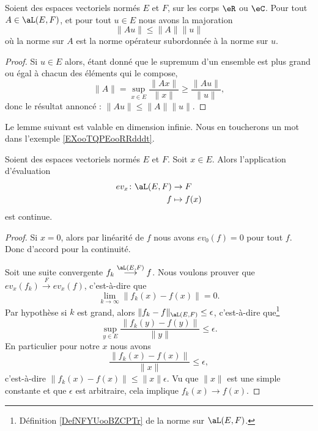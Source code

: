 \begin{lemma}       \label{LEMooIBLEooLJczmu}
	Soient des espaces vectoriels normés \( E\) et \( F\), sur les corps \( \eR\) ou \( \eC\). Pour tout \( A\in \aL(E,F)\), et pour tout \( u\in E\) nous avons la majoration
	\begin{equation}
		\| Au \|\leq \| A \|\| u \|
	\end{equation}
	où la norme sur \( A\) est la norme opérateur subordonnée à la norme sur \( u\).
\end{lemma}

\begin{proof}
	Si \( u\in E\) alors, étant donné que le supremum d'un ensemble est plus grand ou égal à chacun des éléments qui le compose,
	\begin{equation}
		\| A \|=\sup_{x\in E}\frac{ \| Ax \| }{ \| x \| }\geq \frac{ \| Au \| }{ \| u \| },
	\end{equation}
	donc le résultat annoncé : \( \| Au \|\leq \| A \|\| u \|\).
\end{proof}

Le lemme suivant est valable en dimension infinie. Nous en toucherons un mot dans l'exemple \ref{EXooTQPEooRRdddt}.
\begin{lemma}       \label{LEMooWFNXooLyTyyX}
	Soient des espaces vectoriels normés \( E\) et \( F\). Soit \( x\in E\). Alors l'application d'évaluation
	\begin{equation}
		\begin{aligned}
			ev_x\colon \aL(E,F) & \to F        \\
			f                   & \mapsto f(x)
		\end{aligned}
	\end{equation}
	est continue.
\end{lemma}

\begin{proof}
	Si \( x=0\), alors par linéarité de \( f\) nous avons \( ev_0(f)=0\) pour tout \( f\). Donc d'accord pour la continuité.

	Soit une suite convergente \( f_k\stackrel{\aL(E,F)}{\longrightarrow}f\). Nous voulons prouver que \( ev_x(f_k)\stackrel{F}{\longrightarrow}ev_x(f)\), c'est-à-dire que
	\begin{equation}
		\lim_{k\to \infty} \| f_k(x)-f(x) \|=0.
	\end{equation}
	Par hypothèse si \( k\) est grand, alors \( \| f_k-f  \|_{\aL(E,F)}\leq \epsilon\), c'est-à-dire que\footnote{Définition \ref{DefNFYUooBZCPTr} de la norme sur \( \aL(E,F)\).}
	\begin{equation}
		\sup_{y\in E}\frac{ \| f_k(y)-f(y) \| }{ \| y \| }\leq \epsilon.
	\end{equation}
	En particulier pour notre \( x\) nous avons
	\begin{equation}
		\frac{ \| f_k(x)-f(x) \| }{ \| x \| }\leq \epsilon,
	\end{equation}
	c'est-à-dire \( \| f_k(x)-f(x) \|\leq \| x \|\epsilon\). Vu que \( \| x \|\) est une simple constante et que \( \epsilon\) est arbitraire, cela implique \( f_k(x)\to f(x)\).
\end{proof}


